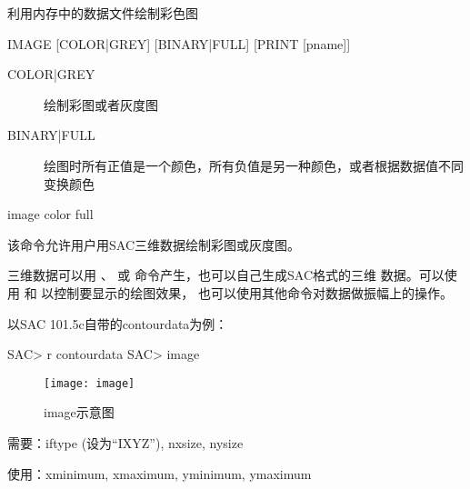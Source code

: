 \label{cmd:image}

利用内存中的数据文件绘制彩色图

\begin{SACSTX}
IMAGE [COLOR|GREY] [BINARY|FULL] [PRINT [pname]]
\end{SACSTX}

\begin{description}
\item [COLOR|GREY] 绘制彩图或者灰度图
\item [BINARY|FULL] 绘图时所有正值是一个颜色，所有负值是另一种颜色，或者根据数据值不同变换颜色
\end{description}

\begin{SACDFT}
image color full
\end{SACDFT}

该命令允许用户用SAC三维数据绘制彩图或灰度图。

三维数据可以用 、
 或  命令产生，也可以自己生成SAC格式的三维
数据。可以使用  和  以控制要显示的绘图效果，
也可以使用其他命令对数据做振幅上的操作。

以SAC 101.5c自带的contourdata为例：
\begin{SACCode}
SAC> r contourdata
SAC> image
\end{SACCode}

\begin{figure}[!ht]
\centering
\texttt{[image: image]}
\caption{image示意图}
\end{figure}

需要：iftype (设为``IXYZ''), nxsize, nysize

使用：xminimum, xmaximum, yminimum, ymaximum
